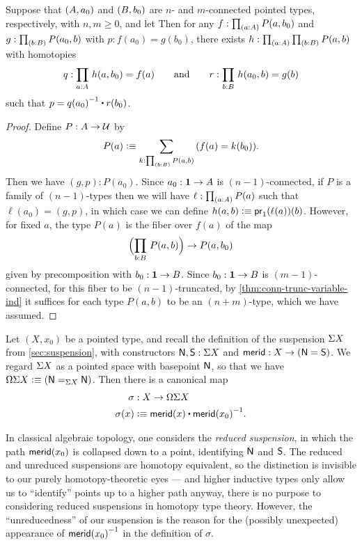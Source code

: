 \begin{lem}\label{thm:wedge-connectivity}
  Suppose that $\pairr{A,a_0}$ and $\pairr{B,b_0}$ are $n$- and $m$-connected pointed types, respectively, with $n,m\geq0$, and let 
%
%
Then for any ${f:\prd{a:A} P(a,b_0)}$ and ${g:\prd{b:B} P(a_0,b)}$ with $p:f(a_0) = g(b_0)$, there exists $h:\prd{a:A}{b:B} P(a,b)$ with homotopies
%
\begin{equation*}
  q:\prd{a:A} h(a,b_0)=f(a)
  \qquad\text{and}\qquad
  r:\prd{b:B} h(a_0,b)=g(b)
 \end{equation*}
%
such that $p = \opp{q(a_0)} \ct r(b_0)$.
\end{lem}
\begin{proof}
  Define $P:A\to\type$ by
  \[ P(a) \defeq \sm{k:\prd{b:B} P(a,b)} (f(a) = k(b_0)). \]
  Then we have $(g,p):P(a_0)$.
  Since $a_0:\unit\to A$ is $(n-1)$-connected, if $P$ is a family of $(n-1)$-types then we will have $\ell:\prd{a:A} P(a)$ such that $\ell(a_0) = (g,p)$, in which case we can define $h(a,b) \defeq \proj1(\ell(a))(b)$.
  However, for fixed $a$, the type $P(a)$ is the fiber over $f(a)$ of the map
  \[ \Parens{\prd{b:B} P(a,b) } \to P(a,b_0) \]
  given by precomposition with $b_0:\unit\to B$.
  Since $b_0:\unit\to B$ is $(m-1)$-connected, for this fiber to be $(n-1)$-truncated, by \autoref{thm:conn-trunc-variable-ind} it suffices for each type $P(a,b)$ to be an $(n+m)$-type, which we have assumed.
\end{proof}

Let $(X,x_0)$ be a pointed type, and recall the definition of the suspension $\susp X$ from \autoref{sec:suspension}, with constructors $\north,\south:\susp X$ and $\merid:X \to (\north=\south)$.
We regard $\susp X$ as a pointed space with basepoint $\north$, so that we have $\Omega\susp X \defeq (\id[\susp X]\north\north)$.
Then there is a canonical map
\begin{align*}
  \sigma &: X \to \Omega\susp X\\
  \sigma(x) &\defeq \merid(x) \ct \opp{\merid(x_0)}.
\end{align*}

\begin{rmk}
  In classical algebraic topology, one considers the \emph{reduced suspension}, in which the path $\merid(x_0)$ is collapsed down to a point, identifying $\north$ and $\south$.
  The reduced and unreduced suspensions are homotopy equivalent, so the distinction is invisible to our purely homotopy-theoretic eyes --- and higher inductive types only allow us to ``identify'' points up to a higher path anyway, there is no purpose to considering reduced suspensions in homotopy type theory.
  However, the ``unreducedness'' of our suspension is the reason for the (possibly unexpected) appearance of $\opp{\merid(x_0)}$ in the definition of $\sigma$.
\end{rmk}

